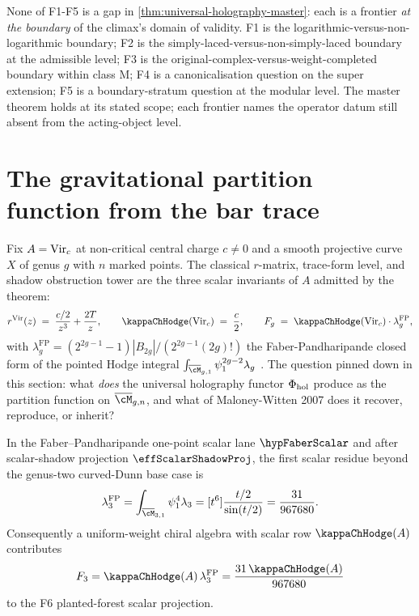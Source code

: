 \begin{remark}
None of F1-F5 is a gap in
\cref{thm:universal-holography-master}: each is a frontier
\emph{at the boundary} of the climax's domain of validity. F1 is
the logarithmic-versus-non-logarithmic boundary; F2 is the
simply-laced-versus-non-simply-laced boundary at the admissible
level; F3 is the original-complex-versus-weight-completed boundary
within class M; F4 is a canonicalisation question on the super
extension; F5 is a boundary-stratum question at the modular level.
The master theorem holds at its stated scope; each frontier names the
operator datum still absent from the acting-object level.
\end{remark}

\section{The gravitational partition function from the bar trace}
\label{sec:climax-gravity-partition}

Fix $A = \mathrm{Vir}_{c}$ at non-critical central charge $c \neq 0$ and a
smooth projective curve $X$ of genus $g$ with $n$ marked points. The
classical $r$-matrix, trace-form level, and shadow obstruction tower
are the three scalar invariants of $A$ admitted by the theorem:
\[
 r^{\Vir}(z) \;=\; \frac{c/2}{z^{3}} + \frac{2T}{z},
 \qquad
 \kappaChHodge(\Vir_{c}) \;=\; \frac{c}{2},
 \qquad
 F_{g} \;=\; \kappaChHodge(\Vir_c) \cdot \lambda_{g}^{\mathrm{FP}},
\]
with $\lambda_{g}^{\mathrm{FP}} = (2^{2g-1} - 1)|B_{2g}| / (2^{2g-1}
(2g)!)$ the Faber-Pandharipande closed form of the pointed Hodge
integral
$\int_{\overline{\cM}_{g,1}}\psi_1^{2g-2}\lambda_{g}$
\cite{FP00}. The question pinned down in this
section: what \emph{does} the universal holography functor $\Phi_{\mathrm{hol}}$
produce as the partition function on $\overline{\cM}_{g, n}$, and
what of Maloney-Witten 2007 does it recover, reproduce, or inherit?

\begin{proposition}
\ClaimStatusProvedHere
In the Faber--Pandharipande one-point scalar lane \(\hypFaberScalar\)
and after scalar-shadow projection \(\effScalarShadowProj\), the first
scalar residue beyond the genus-two curved-Dunn base case is
\[
 \lambda_3^{\mathrm{FP}}
 =
 \int_{\overline{\cM}_{3,1}}\psi_1^4\lambda_3
 =
 [t^6]\frac{t/2}{\sin(t/2)}
 =
 \frac{31}{967680}.
\]
Consequently a uniform-weight chiral algebra with scalar row
\(\kappaChHodge(A)\) contributes
\[
 F_3=\kappaChHodge(A)\,\lambda_3^{\mathrm{FP}}
 =
 \frac{31\,\kappaChHodge(A)}{967680}
\]
to the F6 planted-forest scalar projection.
\end{proposition}

